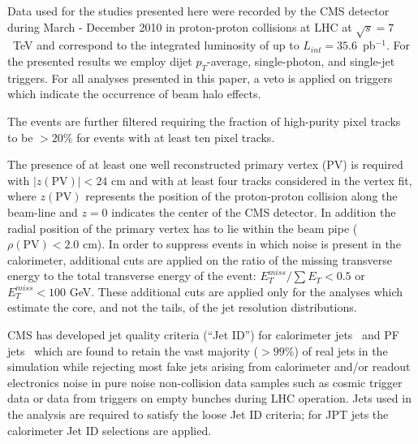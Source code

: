 \label{sec:data}

Data used for the studies presented here were recorded by the CMS
detector during March - December 2010 
in proton-proton collisions at LHC
at $\sqrt{s}=7$~TeV
and correspond to the integrated luminosity of up to
$L_{int}=35.6$~pb$^{-1}$.
For the presented results we employ  dijet $p_T$-average, single-photon, and single-jet 
triggers. For all analyses presented in this paper, 
a veto is applied on  triggers which indicate the occurrence of  beam halo effects.


The events are further filtered requiring the fraction of high-purity 
pixel tracks~\cite{bib:tracking900} to be $>20\%$ for events with at least 
ten pixel tracks.

The presence of at least one well reconstructed  primary vertex (PV) is
required with $|z(\mathrm{PV})|<24$ cm and with  at least four
tracks considered in the vertex fit,
where $z(\mathrm{PV})$ represents the position of the proton-proton
collision along the beam-line and $z=0$ indicates the center of the CMS detector. In addition
the radial position of the primary vertex has to lie within the beam
pipe  ($\rho(\mathrm{PV})<2.0$ cm).  In order to suppress events in which noise 
is present  in the calorimeter,  additional cuts  are applied on the ratio 
of the  missing  transverse energy to the total transverse energy of the event:
 $E_T^{miss}/\sum{E_T}<0.5$ or $E_T^{miss}<100$ GeV. These additional cuts are applied only
for the analyses which estimate the core, and not the tails, of the jet 
resolution distributions.

CMS has developed jet quality criteria (``Jet ID'') for calorimeter
jets~\cite{bib:jetid} and PF jets~\cite{bib:ichep_pas}
which are found to retain
the vast majority ($>99\%$) of real jets in the simulation while rejecting most
fake jets arising from calorimeter and/or readout electronics noise in pure noise 
non-collision data samples such
as  cosmic trigger data  or data from triggers on empty bunches during LHC operation. 
Jets used in the analysis are required to satisfy the loose Jet ID criteria;
for JPT jets the calorimeter Jet ID selections are applied.


